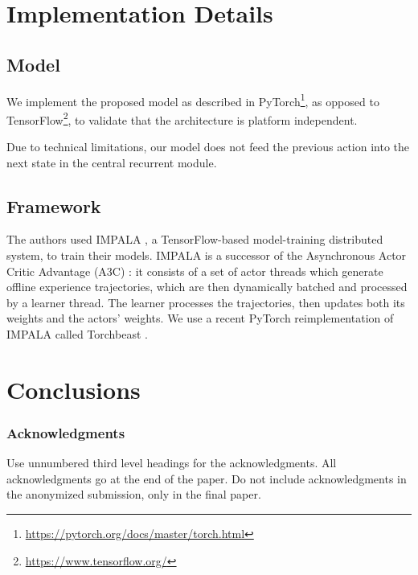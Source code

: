 \documentclass{article}
\begin{document}
\section{Implementation Details}
\subsection{Model}

We implement the proposed model as described in PyTorch\footnote{\url{https://pytorch.org/docs/master/torch.html}}, as opposed to TensorFlow\footnote{\url{https://www.tensorflow.org/}}, to validate that the architecture is platform independent. 

Due to technical limitations, our model does not feed the previous action into the next state in the central recurrent module.

\subsection{Framework}
The authors used IMPALA \cite{espeholt2018impala}, a TensorFlow-based model-training distributed system, to train their models.  IMPALA is a successor of the Asynchronous Actor Critic Advantage (A3C) \cite{}: it consists of a set of actor threads which generate offline experience trajectories, which are then dynamically batched and processed by a learner thread. The learner processes the trajectories, then updates both   its weights and the actors' weights. We use a recent PyTorch reimplementation of IMPALA called Torchbeast \cite{kuttler2019torchbeast}.

\section{Conclusions}

\subsubsection*{Acknowledgments}

Use unnumbered third level headings for the acknowledgments. All acknowledgments
go at the end of the paper. Do not include acknowledgments in the anonymized
submission, only in the final paper.

\small



\end{document}
